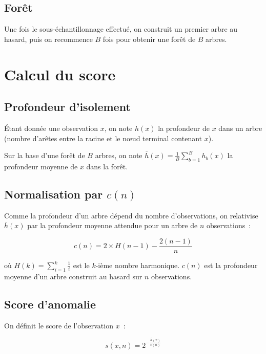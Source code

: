 \documentclass[a4paper,11pt]{article}
\theoremstyle{definition}
\theoremstyle{remark}
\begin{document}
\subsection{For\^et}

Une fois le sous-\'echantillonnage effectu\'e, on construit un premier arbre
au hasard, puis on recommence $B$ fois pour obtenir une for\^et de $B$ arbres.

\section{Calcul du score}

\subsection{Profondeur d'isolement}

\'Etant donn\'ee une observation $x$, on note $h(x)$ la profondeur de
$x$ dans un arbre (nombre d'ar\^etes entre la racine et le n\oe ud
terminal contenant $x$).

Sur la base d'une for\^et de $B$ arbres, on note
$\overline{h}(x) = \frac{1}{B} \sum_{b=1}^{B} h_b(x)$ la profondeur
moyenne de $x$ dans la for\^et.

\subsection{Normalisation par $c(n)$}

Comme la profondeur d'un arbre d\'epend du nombre d'observations, on
relativise $\overline{h}(x)$ par la profondeur moyenne attendue pour un
arbre de $n$ observations~:

\begin{equation}
c(n) = 2 \times H(n-1) - \frac{2(n-1)}{n}
\end{equation}

o\`u $H(k) = \sum_{i=1}^{k} \frac{1}{i}$ est le $k$-i\`eme nombre
harmonique. $c(n)$ est la profondeur moyenne d'un arbre construit au
hasard sur $n$ observations.

\subsection{Score d'anomalie}

On d\'efinit le score de l'observation $x$~:

\begin{equation}
s(x, n) = 2^{-\frac{\overline{h}(x)}{c(n)}}
\end{equation}
\end{document}
